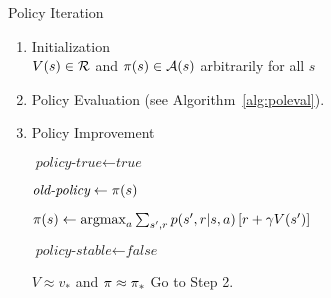 
\begin{algorithm}
\caption{Policy Iteration}
\label{alg:politer}

\begin{enumerate}

	\item Initialization \\
		$V(s) \in \mathcal{R}$
		and
		$\pi(s) \in \mathcal{A}(s)$ arbitrarily for all $s$

	\item Policy Evaluation (see Algorithm~\ref{alg:poleval}).


	\item Policy Improvement
		\begin{algorithmic}[0]
			\State $\textit{policy-true} \gets \textit{true}$


				\State $\textit{old-policy} \gets \pi(s)$

				\State $\pi(s) \gets
					\operatorname*{argmax}_{a} \sum_{s',r} {
						p(s',r|s,a)\left[r+\gamma V(s')\right]
						}$

					\State $\textit{policy-stable} \gets \textit{false}$
				\EndIf

			\EndFor

				\State \Return $V \approx v_*$
					and $\pi \approx \pi_*$
			\Else
				\State Go to Step 2.
			\EndIf
		\end{algorithmic}

\end{enumerate}

\end{algorithm}
